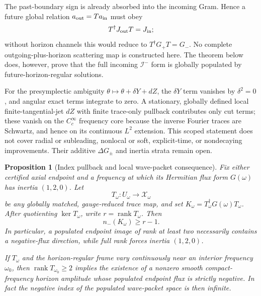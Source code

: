 \documentclass[11pt]{article}
\newtheorem{proposition}[theorem]{Proposition}
\theoremstyle{definition}
\theoremstyle{remark}
\begin{document}
The past-boundary sign is already absorbed into the incoming Gram.  Hence a
future global relation \(a_{\rm out}=T a_{\rm in}\) must obey
\begin{equation}\label{eq:endpoint-global-conservation}
 T^\dagger J_{\rm out}T=J_{\rm in};
\end{equation}
without horizon channels this would reduce to
\(T^\dagger G_+T=G_-\).  No complete outgoing-plus-horizon scattering map is
constructed here.  The theorem below does, however, prove that the full
incoming \(\mathscr I^-\) form is globally populated by future-horizon-regular
solutions.

For the presymplectic ambiguity
\(\theta\mapsto\theta+\delta Y+dZ\), the \(\delta Y\) term vanishes by
\(\delta^2=0\), and angular exact terms integrate to zero.  A stationary,
globally defined local finite-tangential-jet \(dZ\) with finite trace-only
pullback contributes only cut terms; these vanish on the
\(C_c^\infty\) frequency core because the inverse Fourier traces are
Schwartz, and hence on its continuous \(L^2\) extension.  This scoped
statement does not cover radial or subleading, nonlocal or soft,
explicit-time, or nondecaying improvements.  Their additive
\(\Delta G_\pm\) and inertia strata remain open.

\begin{proposition}[Index pullback and local wave-packet consequence]
\label{prop:endpoint-index-pullback}
Fix either certified axial endpoint and a frequency at which its Hermitian
flux form \(G(\omega)\) has inertia \((1,2,0)\).  Let
\[
 T_\omega:U_\omega\longrightarrow\mathcal X_\omega
\]
be any globally matched, gauge-reduced trace map, and set
\(K_\omega=T_\omega^\dagger G(\omega)T_\omega\).  After quotienting
\(\ker T_\omega\), write \(r=\operatorname{rank}T_\omega\).  Then
\[
 n_-(K_\omega)\geq r-1.
\]
In particular, a populated endpoint image of rank at least two necessarily
contains a negative-flux direction, while full rank forces inertia
\((1,2,0)\).

If \(T_\omega\) and the horizon-regular frame vary continuously near an
interior frequency \(\omega_0\), then
\(\operatorname{rank}T_{\omega_0}\geq2\) implies the existence of a
nonzero smooth compact-frequency horizon amplitude whose populated endpoint
flux is strictly negative.  In fact the negative index of the populated
wave-packet space is then infinite.
\end{proposition}
\end{document}
